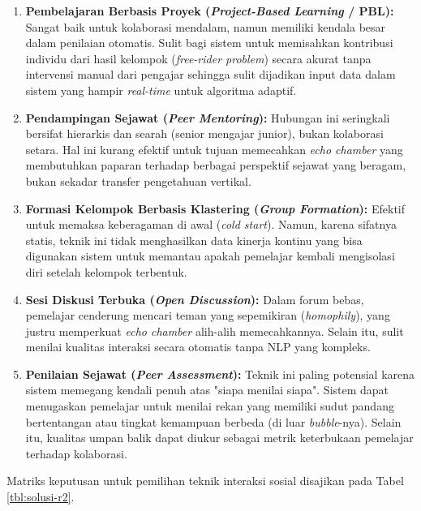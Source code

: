 \begin{enumerate}
    \item \textbf{Pembelajaran Berbasis Proyek (\textit{Project-Based Learning} / PBL):} Sangat baik untuk kolaborasi mendalam, namun memiliki kendala besar dalam penilaian otomatis. Sulit bagi sistem untuk memisahkan kontribusi individu dari hasil kelompok (\textit{free-rider problem}) secara akurat tanpa intervensi manual dari pengajar sehingga sulit dijadikan input data dalam sistem yang hampir \textit{real-time} untuk algoritma adaptif.

    \item \textbf{Pendampingan Sejawat (\textit{Peer Mentoring}):} Hubungan ini seringkali bersifat hierarkis dan searah (senior mengajar junior), bukan kolaborasi setara. Hal ini kurang efektif untuk tujuan memecahkan \textit{echo chamber} yang membutuhkan paparan terhadap berbagai perspektif sejawat yang beragam, bukan sekadar transfer pengetahuan vertikal.

    \item \textbf{Formasi Kelompok Berbasis Klastering (\textit{Group Formation}):} Efektif untuk memaksa keberagaman di awal (\textit{cold start}). Namun, karena sifatnya statis, teknik ini tidak menghasilkan data kinerja kontinu yang bisa digunakan sistem untuk memantau apakah pemelajar kembali mengisolasi diri setelah kelompok terbentuk.

    \item \textbf{Sesi Diskusi Terbuka (\textit{Open Discussion}):} Dalam forum bebas, pemelajar cenderung mencari teman yang sepemikiran (\textit{homophily}), yang justru memperkuat \textit{echo chamber} alih-alih memecahkannya. Selain itu, sulit menilai kualitas interaksi secara otomatis tanpa NLP yang kompleks.

    \item \textbf{Penilaian Sejawat (\textit{Peer Assessment}):} Teknik ini paling potensial karena sistem memegang kendali penuh atas "siapa menilai siapa". Sistem dapat menugaskan pemelajar untuk menilai rekan yang memiliki sudut pandang bertentangan atau tingkat kemampuan berbeda (di luar \textit{bubble}-nya). Selain itu, kualitas umpan balik dapat diukur sebagai metrik keterbukaan pemelajar terhadap kolaborasi.
\end{enumerate}

Matriks keputusan untuk pemilihan teknik interaksi sosial disajikan pada Tabel \ref{tbl:solusi-r2}.



